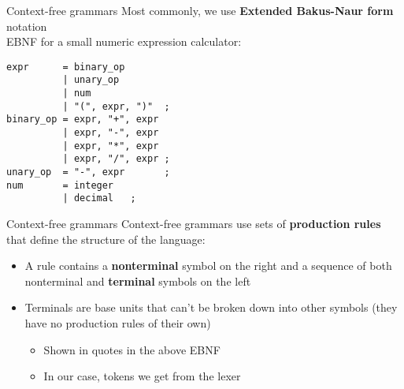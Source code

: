 \documentclass[../index.tex]{subfiles}
\begin{document}
\renewcommand{\currenttitle}{Context-free grammars}
\begin{frame}[fragile]{\currenttitle}
  \vspace*{1em}
  Most commonly, we use \textbf{Extended Bakus-Naur form} notation \\[1.5em]

  EBNF for a small numeric expression calculator: \\[1em]

  \begin{lstlisting}[xleftmargin=2em]
expr      = binary_op
          | unary_op
          | num
          | "(", expr, ")"  ;
binary_op = expr, "+", expr
          | expr, "-", expr
          | expr, "*", expr
          | expr, "/", expr ;
unary_op  = "-", expr       ;
num       = integer
          | decimal   ;
  \end{lstlisting}
\end{frame}

\begin{frame}[fragile]{\currenttitle}
  Context-free grammars use sets of \textbf{production rules} that define the
  structure of the language:
  \begin{itemize}
    \item<+-> A rule contains a \textbf{nonterminal} symbol on the right and a
      sequence of both nonterminal and \textbf{terminal} symbols on the left
    \item<+-> Terminals are base units that can't be broken down into other symbols
      (they have no production rules of their own)
      \begin{itemize}
        \item Shown in quotes in the above EBNF
        \item In our case, tokens we get from the lexer
      \end{itemize}
  \end{itemize}
\end{frame}
\end{document}

